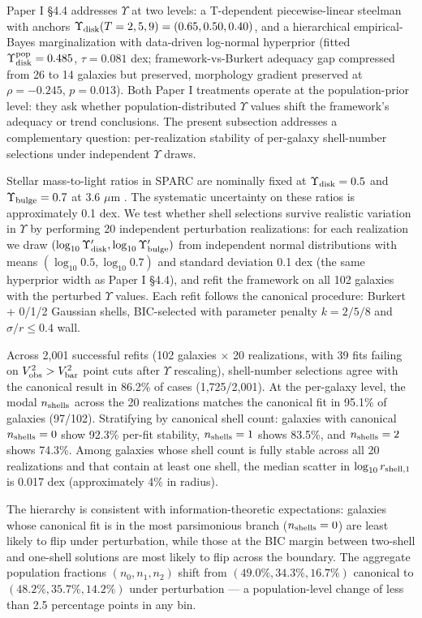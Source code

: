 \documentclass[linenumbers,trackchanges]{aastex701}
\begin{document}
Paper I \S4.4 addresses $\Upsilon$ at two levels: a T-dependent piecewise-linear steelman with anchors $\Upsilon_{\rm disk}(T = 2, 5, 9) = (0.65, 0.50, 0.40)$, and a hierarchical empirical-Bayes marginalization with data-driven log-normal hyperprior (fitted $\Upsilon^{\rm pop}_{\rm disk} = 0.485$, $\tau = 0.081$ dex; framework-vs-Burkert adequacy gap compressed from 26 to 14 galaxies but preserved, morphology gradient preserved at $\rho = -0.245$, $p = 0.013$). Both Paper I treatments operate at the population-prior level: they ask whether population-distributed $\Upsilon$ values shift the framework's adequacy or trend conclusions. The present subsection addresses a complementary question: per-realization stability of per-galaxy shell-number selections under independent $\Upsilon$ draws.

Stellar mass-to-light ratios in SPARC are nominally fixed at $\Upsilon_{\rm disk} = 0.5$ and $\Upsilon_{\rm bulge} = 0.7$ at 3.6 $\mu$m \citep{Lelli2016}. The systematic uncertainty on these ratios is approximately 0.1 dex. We test whether shell selections survive realistic variation in $\Upsilon$ by performing 20 independent perturbation realizations: for each realization we draw $(\log_{10}\Upsilon_{\rm disk}', \log_{10}\Upsilon_{\rm bulge}')$ from independent normal distributions with means $(\log_{10} 0.5, \log_{10} 0.7)$ and standard deviation 0.1 dex (the same hyperprior width as Paper I \S4.4), and refit the framework on all 102 galaxies with the perturbed $\Upsilon$ values. Each refit follows the canonical procedure: Burkert + 0/1/2 Gaussian shells, BIC-selected with parameter penalty $k = 2/5/8$ and $\sigma/r \le 0.4$ wall.

Across 2,001 successful refits (102 galaxies $\times$ 20 realizations, with 39 fits failing on $V_{\rm obs}^2 > V_{\rm bar}^2$ point cuts after $\Upsilon$ rescaling), shell-number selections agree with the canonical result in 86.2\% of cases (1,725/2,001). At the per-galaxy level, the modal $n_{\rm shells}$ across the 20 realizations matches the canonical fit in 95.1\% of galaxies (97/102). Stratifying by canonical shell count: galaxies with canonical $n_{\rm shells} = 0$ show 92.3\% per-fit stability, $n_{\rm shells} = 1$ shows 83.5\%, and $n_{\rm shells} = 2$ shows 74.3\%. Among galaxies whose shell count is fully stable across all 20 realizations and that contain at least one shell, the median scatter in $\log_{10} r_{\rm shell,1}$ is 0.017 dex (approximately 4\% in radius).

The hierarchy is consistent with information-theoretic expectations: galaxies whose canonical fit is in the most parsimonious branch ($n_{\rm shells} = 0$) are least likely to flip under perturbation, while those at the BIC margin between two-shell and one-shell solutions are most likely to flip across the boundary. The aggregate population fractions $(n_0, n_1, n_2)$ shift from $(49.0\%, 34.3\%, 16.7\%)$ canonical to $(48.2\%, 35.7\%, 14.2\%)$ under perturbation --- a population-level change of less than 2.5 percentage points in any bin.
\end{document}
